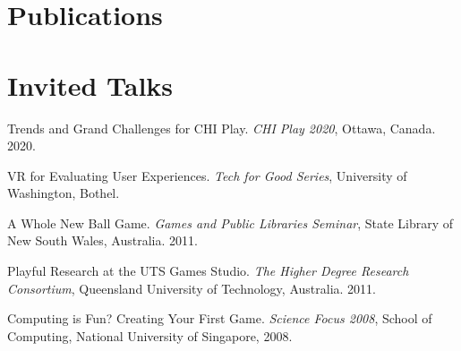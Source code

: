 \documentclass[10pt,a4paper]{article}
\renewenvironment{itemize}{
  \begin{list}{}{
    \setlength{\leftmargin}{1.5em}
    \setlength{\itemsep}{0.25em}
    \setlength{\parskip}{0pt}
    \setlength{\parsep}{0.25em}
  }
}{
  \end{list}
}
\begin{document}
\section*{Publications}

\nocite{*}


\printbibliography[type=inproceedings,heading=subbibliography,title={Peer-reviewed Conference Papers}]
\printbibliography[type=article,heading=subbibliography,title={Peer-reviewed Journal Articles}]
\printbibliography[filter=book,heading=subbibliography,title={Book Chapters}]
\printbibliography[type=misc,heading=subbibliography,title={Edited Proceedings}]

\section*{Invited Talks}

\begin{itemize}

    \item Trends and Grand Challenges for CHI Play.
        \textit{CHI Play 2020}, Ottawa, Canada.
        2020.

    \item VR for Evaluating User Experiences.
        \textit{Tech for Good Series}, University of Washington, Bothel. 

    \item A Whole New Ball Game.
        \textit{Games and Public Libraries Seminar}, State Library of New South Wales, Australia.
        2011.

    \item Playful Research at the UTS Games Studio.
        \textit{The Higher Degree Research Consortium}, Queensland University of Technology, Australia.
        2011.

    \item Computing is Fun? Creating Your First Game.
        \textit{Science Focus 2008}, School of Computing, National University of Singapore,
        2008.

\end{itemize}

\end{document}
